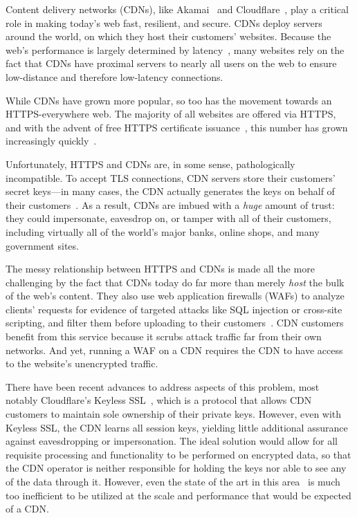 Content delivery networks (CDNs), like Akamai~\cite{akamai} and
Cloudflare~\cite{cloudflare}, play a critical role in making today's web fast,
resilient, and secure.
%
CDNs deploy servers around the world, on which they host their customers'
websites.
%
Because the web's performance is largely determined by
latency~\cite{why-internet-slow}, many websites rely on the fact that CDNs have
proximal servers to nearly all users on the web to ensure low-distance and
therefore low-latency connections.


While CDNs have grown more popular, so too has the movement towards an
HTTPS-everywhere web.
%
The majority of all websites are offered via HTTPS, and with the advent of free
HTTPS certificate issuance~\cite{lets-encrypt}, this number has grown
increasingly quickly~\cite{felt-2017-https}.


Unfortunately, HTTPS and CDNs are, in some sense, pathologically incompatible.
%
To accept TLS connections, CDN servers store their customers' secret keys---in
many cases, the CDN actually generates the keys on behalf of their
customers~\cite{key-sharing,when-https-meets-cdn}.
%
As a result, CDNs are imbued with a \emph{huge} amount of trust: they could
impersonate, eavesdrop on, or tamper with all of their customers, including
virtually all of the world's major banks, online shops, and many government
sites.


The messy relationship between HTTPS and CDNs is made all the more challenging
by the fact that CDNs today do far more than merely \emph{host} the bulk of the
web's content.
%
They also use web application firewalls (WAFs) to analyze clients' requests for
evidence of targeted attacks like SQL injection or cross-site scripting, and
filter them before uploading to their customers~\cite{securing-cdns}.
%
CDN customers benefit from this service because it scrubs attack traffic far
from their own networks.
%
And yet, running a WAF on a CDN requires the CDN to have access to the
website's unencrypted traffic.


There have been recent advances to address aspects of this problem,
most notably Cloudflare's Keyless SSL~\cite{keyless-ssl}, which is a
protocol that allows CDN customers to maintain sole ownership of their
private keys.
%
However, even with Keyless SSL, the CDN learns all session keys,
yielding little additional assurance against eavesdropping or
impersonation.
%
The ideal solution would allow for all requisite processing and
functionality to be performed on encrypted data, so that the CDN
operator is neither responsible for holding the keys nor able to see
any of the data through it.
%
However, even the state of the art in this
area~\cite{naylor2015multi,naylor2017and,leematls,desmoulins2018pattern,
sherry2015blindbox, canard2017blindids,lan2016embark} is much too
inefficient to be utilized at the scale and performance that would be
expected of a CDN.




